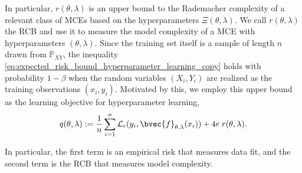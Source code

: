 \documentclass[twoside]{article}
\begin{document}
		In particular, $r(\theta, \lambda)$ is an upper bound to the Rademacher complexity of a relevant class of \glspl{MCE} based on the hyperparameters $\Xi(\theta, \lambda)$. We call $r(\theta, \lambda)$ the \gls{RCB} and use it to measure the model complexity of a \gls{MCE} with hyperparameters $(\theta, \lambda)$. Since the training set itself is a sample of length $n$ drawn from $\mathbb{P}_{X Y}$, the inequality \eqref{eq:expected_risk_bound_hyperparameter_learning_copy} holds with probability $1 - \beta$ when the random variables $(X_{i}, Y_{i})$ are realized as the training observations $(x_{i}, y_{i})$. Motivated by this, we employ this upper bound as the learning objective for hyperparameter learning,
		\begin{equation}
			q(\theta, \lambda) := \frac{1}{n} \sum_{i = 1}^{n} \mathcal{L}_{\epsilon}(y_{i}, \bvec{f}_{\theta, \lambda}(x_{i})) + 4 e \; r(\theta, \lambda).
		\label{eq:learning_objective}
		\end{equation}
		
		In particular, the first term is an empirical risk that measures data fit, and the second term is the \gls{RCB} that measures model complexity.
\end{document}
